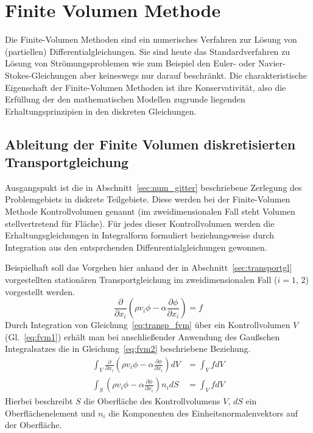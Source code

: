 \section{Finite Volumen Methode}

Die Finite-Volumen Methoden sind ein numerisches Verfahren zur Lösung von (partiellen)
Differentialgleichungen. Sie sind heute das Standardverfahren zu Lösung von Strömungsproblemen
wie zum Beispiel den Euler- oder Navier-Stokes-Gleichungen aber keineswegs nur darauf beschränkt.
Die charakteristische Eigenschaft der Finite-Volumen Methoden ist ihre Konservativität, also
die Erfüllung der den mathematischen Modellen zugrunde liegenden Erhaltungsprinzipien in den
diskreten Gleichungen.

\subsection{Ableitung der Finite Volumen diskretisierten Transportgleichung}

Ausgangspukt ist die in Abschnitt~\ref{sec:num_gitter} beschriebene Zerlegung des Problemgebiets
in diskrete Teilgebiete. Diese werden bei der Finite-Volumen Methode Kontrollvolumen
genannt (im zweidimensionalen Fall steht Volumen stellvertretend für Fläche).
Für jedes dieser Kontrollvolumen werden die Erhaltungsgleichungen in Integralform formuliert
beziehungsweise durch Integration aus den entsprchenden Diffenrentialgleichungen gewonnen.

Beispielhaft soll das Vorgehen hier anhand der in Abschnitt~\ref{sec:transportgl}
vorgestellten stationären Transportgleichung im zweidimensionalen Fall
($i=1$, $2$) vorgestellt werden.
\begin{equation}
  \frac{\partial}{\partial x_i} \left({\rho v_i \phi
- \alpha \frac{\partial \phi}{\partial x_i} }\right) = f
\label{eq:transp_fvm}
\end{equation}
Durch Integration von Gleichung~\eqref{eq:transp_fvm} über ein Kontrollvolumen $V$ (Gl.~\ref{eq:fvm1})
erhält man bei anschließender Anwendung des Gaußschen Integralsatzes die in Gleichung~\eqref{eq:fvm2} beschriebene Beziehung.
\begin{align}
  \int_V \frac{\partial}{\partial x_i} \left({\rho v_i \phi
- \alpha \frac{\partial \phi}{\partial x_i} }\right) dV &= \int_V f dV \label{eq:fvm1}\\
  \int_S  \left({\rho v_i \phi
- \alpha \frac{\partial \phi}{\partial x_i} }\right) n_i dS&= \int_V f dV \label{eq:fvm2}
\end{align}
Hierbei beschreibt $S$ die Oberfläche des Kontrollvolumens $V$, $dS$ ein Oberflächenelement
und $n_i$ die Komponenten des Einheitsnormalenvektors auf der Oberfläche.

